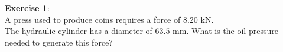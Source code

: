 \documentclass[10pt]{amsart}
\begin{document}
\begin{minipage}[t]{0.45\textwidth}
	\raggedright
	\textbf{Exercise 1}:\\
	A press used to produce coins requires a force of $8.20\text{ kN}$.\\
	The hydraulic cylinder has
	a diameter of $63.5\text{ mm}$. \parb
	What is the oil pressure needed to generate this force?
	\par\vspace{6cm}
\end{minipage}
\newpage
\end{document}
